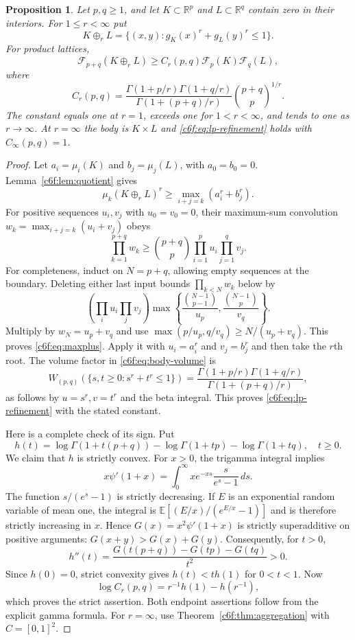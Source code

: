 \documentclass[11pt,a4paper]{article}
\newtheorem{proposition}[theorem]{Proposition}
\theoremstyle{remark}\newtheorem{remark}[theorem]{Remark}
\begin{document}
\begin{proposition}\label{c6f:prop:lp}
Let $p,q\ge1$, and let $K\subset\mathbb R^p$ and
$L\subset\mathbb R^q$ contain zero in their interiors.  For
$1\le r<\infty$ put
\[
 K\oplus_rL=\{(x,y):g_K(x)^r+g_L(y)^r\le1\}.
\]
For product lattices,
\begin{equation}\label{c6f:eq:lp-refinement}
 \mathcal F_{p+q}(K\oplus_rL)
 \ge C_r(p,q)\mathcal F_p(K)\mathcal F_q(L),
\end{equation}
where
\begin{equation}\label{c6f:eq:gamma-constant}
 C_r(p,q)=
 \frac{\Gamma(1+p/r)\Gamma(1+q/r)}{\Gamma(1+(p+q)/r)}
         \binom{p+q}{p}^{1/r}.
\end{equation}
The constant equals one at $r=1$, exceeds one for $1<r<\infty$,
and tends to one as $r\to\infty$.  At $r=\infty$ the body is
$K\times L$ and \eqref{c6f:eq:lp-refinement} holds with
$C_\infty(p,q)=1$.
\end{proposition}

\begin{proof}
Let $a_i=\mu_i(K)$ and $b_j=\mu_j(L)$, with $a_0=b_0=0$.
Lemma~\ref{c6f:lem:quotient} gives
\[
 \mu_k(K\oplus_rL)^r\ge
       \max_{i+j=k}(a_i^r+b_j^r).
\]
For positive sequences $u_i,v_j$ with $u_0=v_0=0$, their
maximum-sum convolution $w_k=\max_{i+j=k}(u_i+v_j)$ obeys
\begin{equation}\label{c6f:eq:maxplus}
 \prod_{k=1}^{p+q}w_k\ge\binom{p+q}{p}
                           \prod_{i=1}^p u_i\prod_{j=1}^q v_j.
\end{equation}
For completeness, induct on $N=p+q$, allowing empty sequences at
the boundary.  Deleting either last input bounds
$\prod_{k<N}w_k$ below by
\[
 \left(\prod_i u_i\prod_jv_j\right)
 \max\left\{\frac{\binom{N-1}{p-1}}{u_p},
             \frac{\binom{N-1}{p}}{v_q}\right\}.
\]
Multiply by $w_N=u_p+v_q$ and use
$\max(p/u_p,q/v_q)\ge N/(u_p+v_q)$.
This proves \eqref{c6f:eq:maxplus}.
Apply it with $u_i=a_i^r$ and $v_j=b_j^r$ and then take the
$r$th root.  The volume factor in \eqref{c6f:eq:body-volume} is
\[
 W_{(p,q)}(\{s,t\ge0:s^r+t^r\le1\})
  =\frac{\Gamma(1+p/r)\Gamma(1+q/r)}
          {\Gamma(1+(p+q)/r)},
\]
as follows by $u=s^r,v=t^r$ and the beta integral.  This proves
\eqref{c6f:eq:lp-refinement} with the stated constant.

Here is a complete check of its sign.  Put
\[
 h(t)=\log\Gamma(1+t(p+q))
        -\log\Gamma(1+tp)-\log\Gamma(1+tq),\quad t\ge0.
\]
We claim that $h$ is strictly convex.  For $x>0$, the trigamma
integral implies
\[
 x\psi'(1+x)=\int_0^\infty xe^{-xs}\frac{s}{e^s-1}\,ds.
\]
The function $s/(e^s-1)$ is strictly decreasing.  If $E$ is an
exponential random variable of mean one, the integral is
$\mathbb E[(E/x)/(e^{E/x}-1)]$ and is therefore strictly
increasing in $x$.  Hence
$G(x)=x^2\psi'(1+x)$ is strictly superadditive on positive
arguments: $G(x+y)>G(x)+G(y)$.  Consequently, for $t>0$,
\[
 h''(t)=\frac{G(t(p+q))-G(tp)-G(tq)}{t^2}>0.
\]
Since $h(0)=0$, strict convexity gives $h(t)<th(1)$ for
$0<t<1$.  Now
\[
 \log C_r(p,q)=r^{-1}h(1)-h(r^{-1}),
\]
which proves the strict assertion.  Both endpoint assertions
follow from the explicit gamma formula.  For $r=\infty$, use
Theorem~\ref{c6f:thm:aggregation} with $C=[0,1]^2$.
\end{proof}
\end{document}
